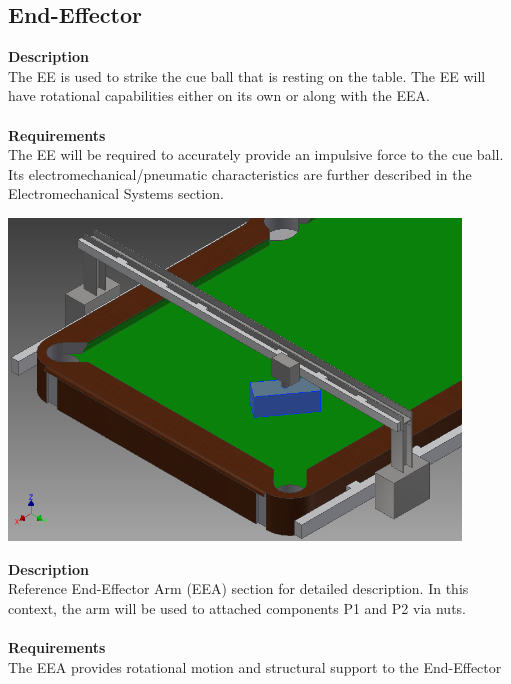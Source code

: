 \documentclass[titlepage]{article}
\begin{document}
\begin{center}
\begin{center}
\begin{center}
\begin{center}
\begin{center}
\begin{center}
\begin{center}
\begin{center}
\begin{center}
\begin{center}
\begin{center}
\begin{center}
\subsection{End-Effector}
\textbf{Description}\\
The EE is used to strike the cue ball that is resting on the table. The EE will have rotational capabilities either on its own or along with the EEA.\\\\
\textbf{Requirements}\\
The EE will be required to accurately provide an impulsive force to the cue ball. Its electromechanical/pneumatic characteristics are further described in the Electromechanical Systems section.
\begin{center}
	\includegraphics[width = 0.9\textwidth]{endEffector.png}	%
\label{fig:eeFig}
\end{center}




\textbf{Description}\\
Reference End-Effector Arm (EEA) section for detailed description. In this context, the arm will be used to attached components P1 and P2 via nuts.\\\\
\textbf{Requirements}\\
The EEA provides rotational motion and structural support to the End-Effector
\begin{center}



\end{center}
\end{center}
\end{center}
\end{center}
\end{center}
\end{center}
\end{center}
\end{center}
\end{center}
\end{center}
\end{center}
\end{center}
\end{center}
\end{document}
